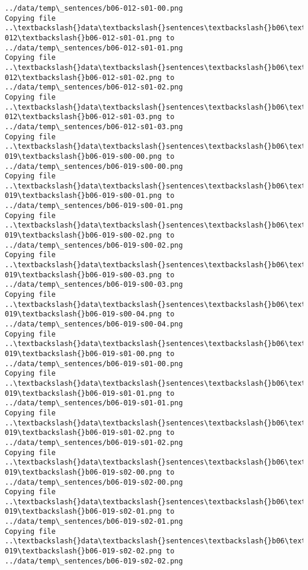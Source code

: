 \documentclass[11pt]{article}
\begin{document}
\begin{Verbatim}[commandchars=\\\{\}]
../data/temp\_sentences/b06-012-s01-00.png
Copying file ..\textbackslash{}data\textbackslash{}sentences\textbackslash{}b06\textbackslash{}b06-012\textbackslash{}b06-012-s01-01.png to
../data/temp\_sentences/b06-012-s01-01.png
Copying file ..\textbackslash{}data\textbackslash{}sentences\textbackslash{}b06\textbackslash{}b06-012\textbackslash{}b06-012-s01-02.png to
../data/temp\_sentences/b06-012-s01-02.png
Copying file ..\textbackslash{}data\textbackslash{}sentences\textbackslash{}b06\textbackslash{}b06-012\textbackslash{}b06-012-s01-03.png to
../data/temp\_sentences/b06-012-s01-03.png
Copying file ..\textbackslash{}data\textbackslash{}sentences\textbackslash{}b06\textbackslash{}b06-019\textbackslash{}b06-019-s00-00.png to
../data/temp\_sentences/b06-019-s00-00.png
Copying file ..\textbackslash{}data\textbackslash{}sentences\textbackslash{}b06\textbackslash{}b06-019\textbackslash{}b06-019-s00-01.png to
../data/temp\_sentences/b06-019-s00-01.png
Copying file ..\textbackslash{}data\textbackslash{}sentences\textbackslash{}b06\textbackslash{}b06-019\textbackslash{}b06-019-s00-02.png to
../data/temp\_sentences/b06-019-s00-02.png
Copying file ..\textbackslash{}data\textbackslash{}sentences\textbackslash{}b06\textbackslash{}b06-019\textbackslash{}b06-019-s00-03.png to
../data/temp\_sentences/b06-019-s00-03.png
Copying file ..\textbackslash{}data\textbackslash{}sentences\textbackslash{}b06\textbackslash{}b06-019\textbackslash{}b06-019-s00-04.png to
../data/temp\_sentences/b06-019-s00-04.png
Copying file ..\textbackslash{}data\textbackslash{}sentences\textbackslash{}b06\textbackslash{}b06-019\textbackslash{}b06-019-s01-00.png to
../data/temp\_sentences/b06-019-s01-00.png
Copying file ..\textbackslash{}data\textbackslash{}sentences\textbackslash{}b06\textbackslash{}b06-019\textbackslash{}b06-019-s01-01.png to
../data/temp\_sentences/b06-019-s01-01.png
Copying file ..\textbackslash{}data\textbackslash{}sentences\textbackslash{}b06\textbackslash{}b06-019\textbackslash{}b06-019-s01-02.png to
../data/temp\_sentences/b06-019-s01-02.png
Copying file ..\textbackslash{}data\textbackslash{}sentences\textbackslash{}b06\textbackslash{}b06-019\textbackslash{}b06-019-s02-00.png to
../data/temp\_sentences/b06-019-s02-00.png
Copying file ..\textbackslash{}data\textbackslash{}sentences\textbackslash{}b06\textbackslash{}b06-019\textbackslash{}b06-019-s02-01.png to
../data/temp\_sentences/b06-019-s02-01.png
Copying file ..\textbackslash{}data\textbackslash{}sentences\textbackslash{}b06\textbackslash{}b06-019\textbackslash{}b06-019-s02-02.png to
../data/temp\_sentences/b06-019-s02-02.png

\end{Verbatim}
\end{document}
